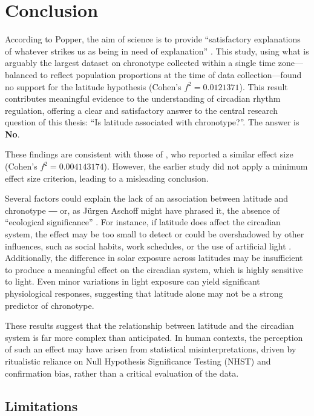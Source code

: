 \documentclass[
12pt,
openright,
oneside,
a4paper,
chapter=TITLE,
section=TITLE,
french,
spanish,
brazil,
english
]{abntex2}
\begin{document}

\chapter{Conclusion}\label{sec-conclusion}

According to Popper, the aim of science is to provide ``satisfactory
explanations of whatever strikes us as being in need of explanation''
\autocite[193]{popper1979}. This study, using what is arguably the
largest dataset on chronotype collected within a single time
zone---balanced to reflect population proportions at the time of data
collection---found no support for the latitude hypothesis (Cohen's
\(f^2 = 0.0121371\)). This result contributes meaningful evidence to the
understanding of circadian rhythm regulation, offering a clear and
satisfactory answer to the central research question of this thesis:
``Is latitude associated with chronotype?''. The answer is \textbf{No}.

These findings are consistent with those of
\textcite{leocadio-miguel2017}, who reported a similar effect size
(Cohen's \(f^2 = 0.004143174\)). However, the earlier study did not
apply a minimum effect size criterion, leading to a misleading
conclusion.

Several factors could explain the lack of an association between
latitude and chronotype ― or, as Jürgen Aschoff might have phrased it,
the absence of ``ecological significance'' \autocite{aschoff1972}. For
instance, if latitude does affect the circadian system, the effect may
be too small to detect or could be overshadowed by other influences,
such as social habits, work schedules, or the use of artificial light
\autocite{bohlen1973,skeldon2021}. Additionally, the difference in solar
exposure across latitudes may be insufficient to produce a meaningful
effect on the circadian system, which is highly sensitive to light. Even
minor variations in light exposure can yield significant physiological
responses, suggesting that latitude alone may not be a strong predictor
of chronotype.

These results suggest that the relationship between latitude and the
circadian system is far more complex than anticipated. In human
contexts, the perception of such an effect may have arisen from
statistical misinterpretations, driven by ritualistic reliance on Null
Hypothesis Significance Testing (NHST) and confirmation bias, rather
than a critical evaluation of the data.

\section{Limitations}\label{limitations}
\end{document}
